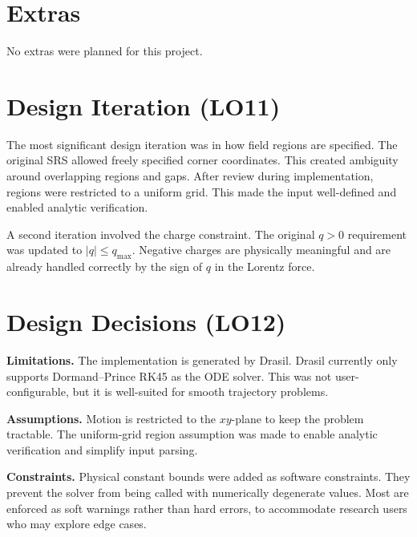 \documentclass{article}
\begin{document}
\section{Extras}

No extras were planned for this project.

\section{Design Iteration (LO11)}

The most significant design iteration was in how field regions are
specified.
The original SRS allowed freely specified corner coordinates.
This created ambiguity around overlapping regions and gaps.
After review during implementation, regions were restricted to a uniform
grid.
This made the input well-defined and enabled analytic verification.

A second iteration involved the charge constraint.
The original $q>0$ requirement was updated to $|q|\le q_\text{max}$.
Negative charges are physically meaningful and are already handled
correctly by the sign of $q$ in the Lorentz force.

\section{Design Decisions (LO12)}

\textbf{Limitations.}
The implementation is generated by Drasil.
Drasil currently only supports Dormand--Prince RK45 as the ODE solver.
This was not user-configurable, but it is well-suited for smooth
trajectory problems.

\textbf{Assumptions.}
Motion is restricted to the $xy$-plane to keep the problem tractable.
The uniform-grid region assumption was made to enable analytic
verification and simplify input parsing.

\textbf{Constraints.}
Physical constant bounds were added as software constraints.
They prevent the solver from being called with numerically degenerate
values.
Most are enforced as soft warnings rather than hard errors, to
accommodate research users who may explore edge cases.
\end{document}
